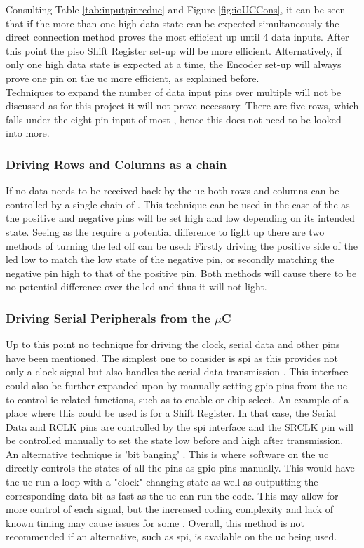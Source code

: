 \documentclass[12pt,a4paper]{report}
\begin{document}
Consulting Table \ref{tab:inputpinreduc} and Figure \ref{fig:ioUCCons}, it can be seen that if the more than one high data state can be expected simultaneously the direct connection method proves the most efficient up until 4 data inputs. After this point the \ac{piso} Shift Register set-up will be more efficient. Alternatively, if only one high data state is expected at a time, the Encoder set-up will always prove one pin on the \ac{uc} more efficient, as explained before.\\
Techniques to expand the number of data input pins over multiple  will not be discussed as for this project it will not prove necessary. There are five rows, which falls under the eight-pin input of most , hence this does not need to be looked into more.
\subsubsection{Driving Rows and Columns as a chain}
If no data needs to be received back by the \ac{uc} both rows and columns can be controlled by a single chain of  \cite{srOpenMusic}. This technique can be used in the case of the  as the positive and negative pins will be set high and low depending on its intended state. Seeing as the  require a potential difference to light up there are two methods of turning the \ac{led} off can be used: Firstly driving the positive side of the \ac{led} low to match the low state of the negative pin, or secondly matching the negative pin high to that of the positive pin. Both methods will cause there to be no potential difference over the \ac{led} and thus it will not light.
\subsubsection{Driving Serial Peripherals from the $\mu$C}
Up to this point no technique for driving the clock, serial data and other pins have been mentioned. The simplest one to consider is \ac{spi} as this provides not only a clock signal but also handles the serial data transmission \cite{SPIAoE}. This interface could also be further expanded upon by manually setting \ac{gpio} pins from the \ac{uc} to control \ac{ic} related functions, such as to enable or chip select. An example of a place where this could be used is for a Shift Register. In that case, the Serial Data and RCLK pins are controlled by the \ac{spi} interface and the SRCLK pin will be controlled manually to set the state low before and high after transmission. \\
An alternative technique is 'bit banging' \cite{bitbanging}. This is where software on the \ac{uc} directly controls the states of all the pins as \ac{gpio} pins manually. This would have the \ac{uc} run a loop with a "clock" changing state as well as outputting the corresponding data bit as fast as the \ac{uc} can run the code. This may allow for more control of each signal, but the increased coding complexity and lack of known timing may cause issues for some  \cite{bitbanging}. Overall, this method is not recommended if an alternative, such as \ac{spi}, is available on the \ac{uc} being used.
\end{document}
